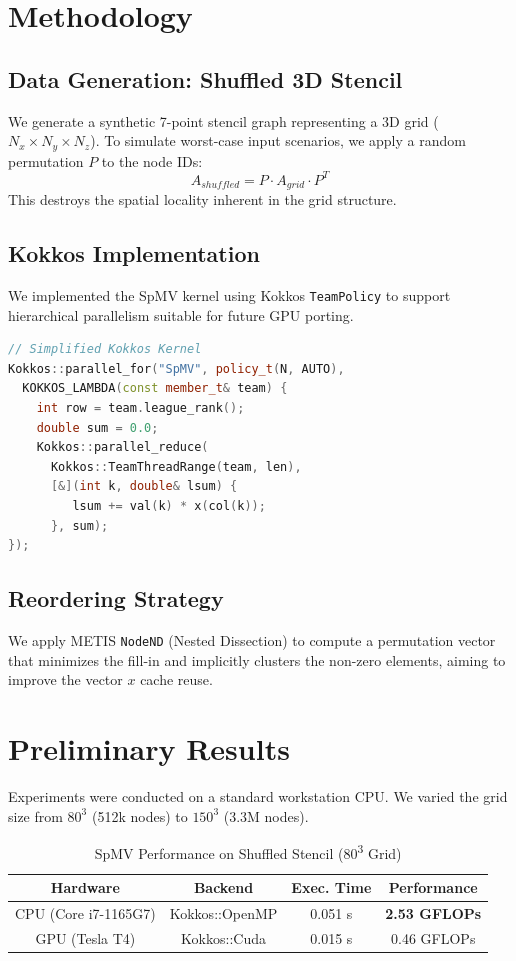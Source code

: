\documentclass[conference]{IEEEtran}
\begin{document}
\section{Methodology}

\subsection{Data Generation: Shuffled 3D Stencil}
We generate a synthetic 7-point stencil graph representing a 3D grid ($N_x \times N_y \times N_z$). To simulate worst-case input scenarios, we apply a random permutation $P$ to the node IDs:
\begin{equation}
    A_{shuffled} = P \cdot A_{grid} \cdot P^T
\end{equation}
This destroys the spatial locality inherent in the grid structure.

\subsection{Kokkos Implementation}
We implemented the SpMV kernel using Kokkos \texttt{TeamPolicy} to support hierarchical parallelism suitable for future GPU porting.
\begin{lstlisting}[language=C++, frame=single, basicstyle=\footnotesize]
// Simplified Kokkos Kernel
Kokkos::parallel_for("SpMV", policy_t(N, AUTO), 
  KOKKOS_LAMBDA(const member_t& team) {
    int row = team.league_rank();
    double sum = 0.0;
    Kokkos::parallel_reduce(
      Kokkos::TeamThreadRange(team, len), 
      [&](int k, double& lsum) {
         lsum += val(k) * x(col(k));
      }, sum);
});
\end{lstlisting}

\subsection{Reordering Strategy}
We apply METIS \texttt{NodeND} (Nested Dissection) to compute a permutation vector that minimizes the fill-in and implicitly clusters the non-zero elements, aiming to improve the vector $x$ cache reuse.

\section{Preliminary Results}
Experiments were conducted on a standard workstation CPU. We varied the grid size from $80^3$ (512k nodes) to $150^3$ (3.3M nodes).

\begin{table}[htbp]
\caption{SpMV Performance on Shuffled Stencil (80\textsuperscript{3} Grid)}
\begin{center}
\begin{tabular}{|c|c|c|c|}
\hline
\textbf{Hardware} & \textbf{Backend} & \textbf{Exec. Time} & \textbf{Performance} \\
\hline
CPU (Core i7-1165G7) & Kokkos::OpenMP & 0.051 s & \textbf{2.53 GFLOPs} \\
GPU (Tesla T4) & Kokkos::Cuda & 0.015 s & 0.46 GFLOPs \\
\hline
\end{tabular}
\label{tab1}
\end{center}
\end{table}
\end{document}
